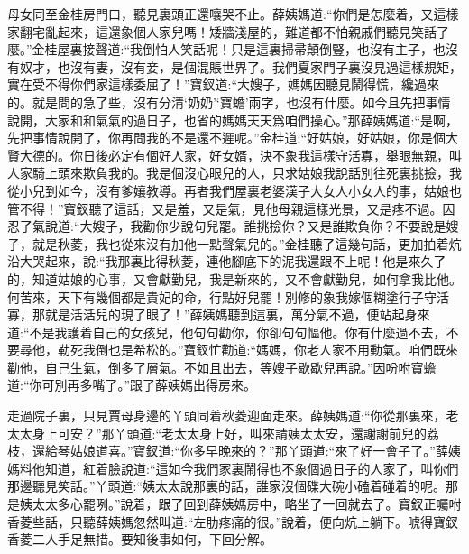 \begin{parag}
    母女同至金桂房門口，聽見裏頭正還嚷哭不止。薛姨媽道:“你們是怎麼着，又這樣家翻宅亂起來，這還象個人家兒嗎！矮牆淺屋的，難道都不怕親戚們聽見笑話了麼。”金桂屋裏接聲道:“我倒怕人笑話呢！只是這裏掃帚顛倒豎，也沒有主子，也沒有奴才，也沒有妻，沒有妾，是個混賬世界了。我們夏家門子裏沒見過這樣規矩，實在受不得你們家這樣委屈了！”寶釵道:“大嫂子，媽媽因聽見鬧得慌，纔過來的。就是問的急了些，沒有分清‘奶奶’‘寶蟾’兩字，也沒有什麼。如今且先把事情說開，大家和和氣氣的過日子，也省的媽媽天天爲咱們操心。”那薛姨媽道:“是啊，先把事情說開了，你再問我的不是還不遲呢。”金桂道:“好姑娘，好姑娘，你是個大賢大德的。你日後必定有個好人家，好女婿，決不象我這樣守活寡，舉眼無親，叫人家騎上頭來欺負我的。我是個沒心眼兒的人，只求姑娘我說話別往死裏挑撿，我從小兒到如今，沒有爹孃教導。再者我們屋裏老婆漢子大女人小女人的事，姑娘也管不得！”寶釵聽了這話，又是羞，又是氣，見他母親這樣光景，又是疼不過。因忍了氣說道:“大嫂子，我勸你少說句兒罷。誰挑撿你？又是誰欺負你？不要說是嫂子，就是秋菱，我也從來沒有加他一點聲氣兒的。”金桂聽了這幾句話，更加拍着炕沿大哭起來，說:“我那裏比得秋菱，連他腳底下的泥我還跟不上呢！他是來久了的，知道姑娘的心事，又會獻勤兒，我是新來的，又不會獻勤兒，如何拿我比他。何苦來，天下有幾個都是貴妃的命，行點好兒罷！別修的象我嫁個糊塗行子守活寡，那就是活活兒的現了眼了！”薛姨媽聽到這裏，萬分氣不過，便站起身來道:“不是我護着自己的女孩兒，他句句勸你，你卻句句慪他。你有什麼過不去，不要尋他，勒死我倒也是希松的。”寶釵忙勸道:“媽媽，你老人家不用動氣。咱們既來勸他，自己生氣，倒多了層氣。不如且出去，等嫂子歇歇兒再說。”因吩咐寶蟾道:“你可別再多嘴了。”跟了薛姨媽出得房來。
\end{parag}


\begin{parag}
    走過院子裏，只見賈母身邊的丫頭同着秋菱迎面走來。薛姨媽道:“你從那裏來，老太太身上可安？”那丫頭道:“老太太身上好，叫來請姨太太安，還謝謝前兒的荔枝，還給琴姑娘道喜。”寶釵道:“你多早晚來的？”那丫頭道:“來了好一會子了。”薛姨媽料他知道，紅着臉說道:“這如今我們家裏鬧得也不象個過日子的人家了，叫你們那邊聽見笑話。”丫頭道:“姨太太說那裏的話，誰家沒個碟大碗小磕着碰着的呢。那是姨太太多心罷咧。”說着，跟了回到薛姨媽房中，略坐了一回就去了。寶釵正囑咐香菱些話，只聽薛姨媽忽然叫道:“左肋疼痛的很。”說着，便向炕上躺下。唬得寶釵香菱二人手足無措。要知後事如何，下回分解。
\end{parag}